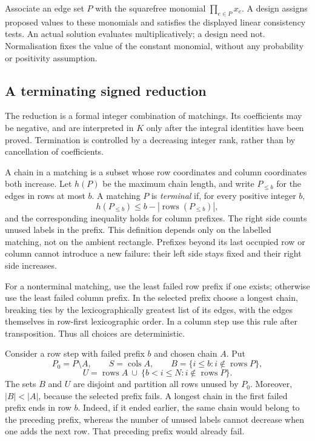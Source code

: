 \documentclass[11pt,a4paper]{article}
\theoremstyle{definition}\newtheorem{definition}[theorem]{Definition}
\theoremstyle{remark}\newtheorem{remark}[theorem]{Remark}
\begin{document}
Associate an edge set $P$ with the squarefree monomial
$\prod_{e\in P}x_e$. A design assigns proposed values to these
monomials and satisfies the displayed linear consistency tests.
An actual solution evaluates multiplicatively; a design need not.
Normalisation fixes the value of the constant monomial, without any
probability or positivity assumption.

\subsection{A terminating signed reduction}
The reduction is a formal integer combination of matchings.
Its coefficients may be negative, and are interpreted in $K$ only
after the integral identities have been proved. Termination is
controlled by a decreasing integer rank, rather than by cancellation
of coefficients.

A chain in a matching is a subset whose row coordinates and column
coordinates both increase.  Let $h(P)$ be the maximum chain length, and
write $P_{\leq b}$ for the edges in rows at most $b$.  A matching $P$ is
\emph{terminal} if, for every positive integer $b$,
\[
 h(P_{\leq b})\leq b-|\operatorname{rows}(P_{\leq b})|,
\]
and the corresponding inequality holds for column prefixes.  The right
side counts unused labels in the prefix.  This definition depends only
on the labelled matching, not on the ambient rectangle.  Prefixes beyond
its last occupied row or column cannot introduce a new failure: their
left side stays fixed and their right side increases.

For a nonterminal matching, use the least failed row prefix if one exists;
otherwise use the least failed column prefix.  In the selected prefix
choose a longest chain, breaking ties by the lexicographically greatest
list of its edges, with the edges themselves in row-first lexicographic
order.  In a column step use this rule after transposition.  Thus all
choices are deterministic.

Consider a row step with failed prefix $b$ and chosen chain $A$.  Put
\[
 P_0=P\setminus A,\qquad S=\operatorname{cols}A,\qquad
 B=\{i\leq b:i\notin\operatorname{rows}P\},
\]
\[
 U=\operatorname{rows}A\ \cup\
       \{b<i\leq N:i\notin\operatorname{rows}P\}.
\]
The sets $B$ and $U$ are disjoint and partition all rows unused by $P_0$.
Moreover, $|B|<|A|$, because the selected prefix fails.  A longest chain
in the first failed prefix ends in row $b$.  Indeed, if it ended earlier,
the same chain would belong to the preceding prefix, whereas the number
of unused labels cannot decrease when one adds the next row.  That
preceding prefix would already fail.
\end{document}
